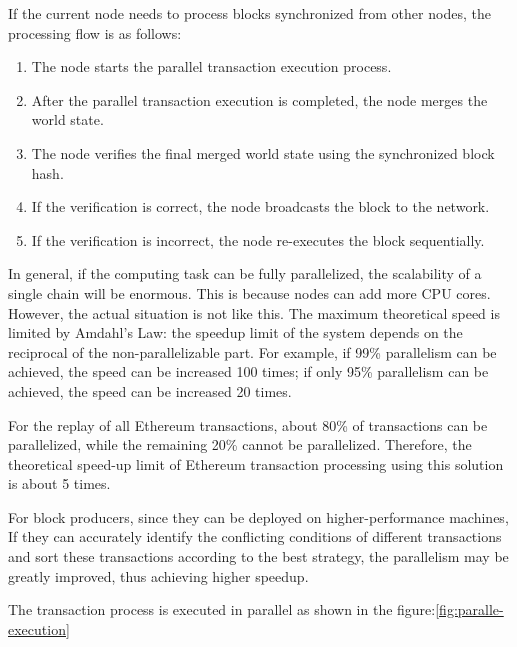If the current node needs to process blocks synchronized from other nodes, the processing flow is as follows:

\begin{enumerate}
    \item The node starts the parallel transaction execution process.
    \item After the parallel transaction execution is completed, the node merges the world state.
    \item The node verifies the final merged world state using the synchronized block hash.
    \item If the verification is correct, the node broadcasts the block to the network.
    \item If the verification is incorrect, the node re-executes the block sequentially.
\end{enumerate}

In general, if the computing task can be fully parallelized, the scalability of a single chain will be enormous. This is because nodes can add more CPU cores. However, the actual situation is not like this. The maximum theoretical speed is limited by Amdahl's Law\cite{website:Amdahls-law}: the speedup limit of the system depends on the reciprocal of the non-parallelizable part. For example, if 99\% parallelism can be achieved, the speed can be increased 100 times; if only 95\% parallelism can be achieved, the speed can be increased 20 times.

For the replay of all Ethereum transactions, about 80\% of transactions can be parallelized, while the remaining 20\% cannot be parallelized. Therefore, the theoretical speed-up limit of Ethereum transaction processing using this solution is about 5 times.

For block producers, since they can be deployed on higher-performance machines, If they can accurately identify the conflicting conditions of different transactions and sort these transactions according to the best strategy, the parallelism may be greatly improved, thus achieving higher speedup.

The transaction process is executed in parallel as shown in the figure:\ref{fig:paralle-execution}

